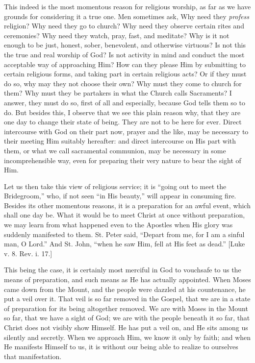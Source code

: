 This indeed is the most momentous reason for religious worship, as
far as we have grounds for considering it a true one. Men sometimes
ask, Why need they \emph{profess} religion? Why need they go to
church? Why need they observe certain rites and ceremonies? Why need
they watch, pray, fast, and meditate? Why is it not enough to be just,
honest, sober, benevolent, and otherwise virtuous? Is not this the
true and real worship of God? Is not activity in mind and conduct the
most acceptable way of approaching Him? How can they please Him by
submitting to certain religious forms, and taking part in certain
religious acts? Or if they must do so, why may they not choose their
own? Why must they come to church for them? Why must they be partakers
in what the Church calls Sacraments? I answer, they must do so, first
of all and especially, because God tells them so to do. But besides
this, I observe that we see this plain reason why, that they are one
day to change their state of being. They are not to be here for ever.
Direct intercourse with God on their part now, prayer and the like,
may be necessary to their meeting Him suitably hereafter: and direct
intercourse on His part with them, or what we call sacramental
communion, may be necessary in some incomprehensible way, even for
preparing their very nature to bear the sight of Him.

Let us then take this view of religious service; it is ``going
out to meet the Bridegroom,'' who, if not seen ``in His
beauty,'' will appear in consuming fire. Besides its other
momentous reasons, it is a preparation for an awful event, which shall
one day be. What it would be to meet Christ at once without
preparation, we may learn from what happened even to the Apostles when
His glory was suddenly manifested to them. St. Peter said,
``Depart from me, for I am a sinful man, O Lord.'' And St.
John, ``when he saw Him, fell at His feet as dead.'' [Luke v.
8. Rev. i. 17.]

This being the case, it is certainly most merciful in God to
vouchsafe to us the means of preparation, and such means as He has
actually appointed. When Moses came down from the Mount, and the
people were dazzled at his countenance, he put a veil over it. That
veil is so far removed in the Gospel, that we are in a state of
preparation for its being altogether removed. We are with Moses in the
Mount so far, that we have a sight of God; we are with the people
beneath it so far, that Christ does not visibly show Himself. He has
put a veil on, and He sits among us silently and secretly. When we
approach Him, we know it only by faith; and when He manifests Himself
to us, it is without our being able to realize to ourselves that
manifestation.

